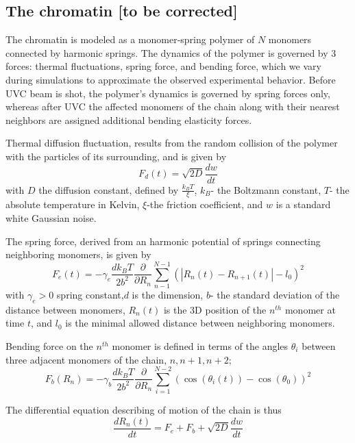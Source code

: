 \documentclass[12pt]{report}
\begin{document}
	\subsection{The chromatin [to be corrected]}	
		The chromatin is modeled as a monomer-spring polymer of $N$ monomers connected by harmonic springs. The dynamics of the polymer is governed by 3 forces: thermal fluctuations, spring force, and bending force, which we vary during simulations to approximate the observed experimental behavior. Before UVC beam is shot, the polymer's dynamics is governed by spring forces only, whereas after UVC the affected monomers of the chain along with their nearest neighbors are assigned additional bending elasticity forces. 
		
		Thermal diffusion fluctuation, results from the random collision of the polymer with the particles of its surrounding, and is given by 
		\begin{equation*}
		F_d(t) = \sqrt{2D}\frac{dw}{dt}
		\end{equation*}
		with $D$ the diffusion constant, defined by $\frac{k_BT}{\xi}$, $k_B$- the Boltzmann constant, $T$- the absolute temperature in Kelvin, $\xi$-the friction coefficient, and $w$ is a standard white Gaussian noise. 
		
		The spring force, derived from an harmonic potential of springs connecting neighboring monomers, is given by
		\begin{equation*}
		F_e(t) = -\gamma_e\frac{dk_BT}{2b^2}\frac{\partial}{\partial R_n}\sum_{n-1}^{N-1}(|R_n(t)-R_{n+1}(t)| -l_0)^2
		\end{equation*}
		with $\gamma_e>0$ spring constant,$d$ is the dimension, $b$- the standard deviation of the distance between monomers, $R_n(t)$ is the 3D position of the $n^{th}$ monomer at time $t$, and $l_0$ is the minimal allowed distance between neighboring monomers.
		
		Bending force on the $n^{th}$ monomer is defined in terms of the angles $\theta_i$ between three adjacent monomers of the chain, $n,n+1,n+2$;
		\begin{equation*}
		F_b(R_n) = -\gamma_b\frac{dk_BT}{2b^2}\frac{\partial}{\partial R_n}\sum_{i=1}^{N-2}(\cos(\theta_i(t))-\cos(\theta_0))^2
		\end{equation*}
		
		The differential equation describing of motion of the chain is thus 
		\begin{equation*}
		\frac{dR_n(t)}{dt}= F_e +F_b +\sqrt{2D} \frac{dw}{dt}     
		\end{equation*}
					
\end{document}
